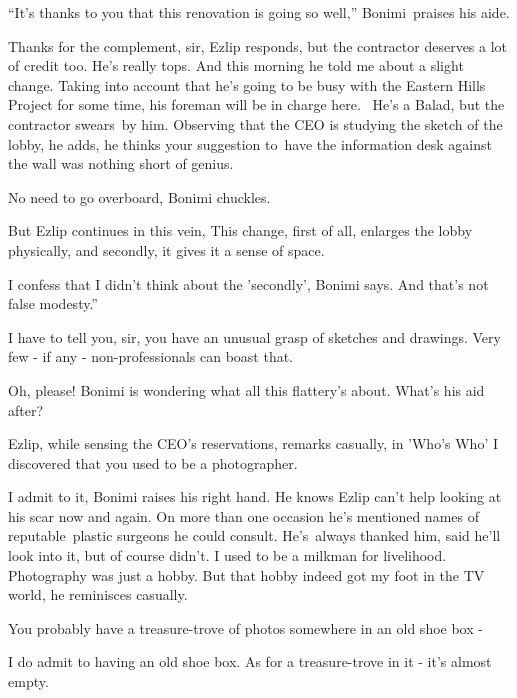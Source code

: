 \documentclass[twoside,11pt]{book}
\begin{document}
{}``It's thanks to you that this renovation is going so well,'' Bonimi{\ }praises his aide.

{\textquotedbl}Thanks for the complement, sir,{\textquotedbl} Ezlip responds, {\textquotedbl}but the contractor deserves
a lot of credit too. He's really tops. And this morning he told me about a slight change. Taking into account that he's
going to be busy with the Eastern Hills Project for some time, his foreman will be in charge here. ~He's a Balad, but
the contractor swears{\ }by him.{\textquotedbl} Observing that the CEO is studying the sketch of the
lobby, he adds, {\textquotedbl}he thinks your suggestion to{\ }have the information desk against the
wall was nothing short of genius.{\textquotedbl} 

{\textquotedbl}No need to go overboard,{\textquotedbl} Bonimi chuckles. 

But Ezlip continues in this vein, {\textquotedbl}This change, first of all, enlarges the lobby physically, and secondly,
it gives it a sense of space.{\textquotedbl}

{\textquotedbl}I confess that I didn't think about the 'secondly',{\textquotedbl} Bonimi says. {\textquotedbl}And that's
not false modesty.''

{\textquotedbl}I have to tell you, sir, you have an unusual grasp of sketches and drawings. Very few - if any -
non-professionals can boast that.{\textquotedbl} 

{\textquotedbl}Oh, please!{\textquotedbl} Bonimi is wondering what all this flattery's about. What's his aid after? 

Ezlip, while sensing the CEO's reservations, remarks casually, {\textquotedbl}in 'Who's Who' I discovered that you used
to be a photographer.{\textquotedbl}

{\textquotedbl}I admit to it,{\textquotedbl} Bonimi raises his right hand. He knows Ezlip can't help looking at his scar
now and again. On more than one occasion he's mentioned names of reputable{\ }plastic surgeons he could
consult. He's\ always thanked him, said he'll look into it, but of course didn't. {\textquotedbl}I used to be a milkman
for livelihood. Photography was just a hobby. But that hobby indeed got my foot in the TV world,{\textquotedbl} he
reminisces casually.\ 

{\textquotedbl}You probably have a treasure-trove of photos somewhere in an old shoe box -{\textquotedbl} 

{\textquotedbl}I do admit to having an old shoe box. As for a treasure-trove in it {}- it's almost
empty.{\textquotedbl}~ 
\end{document}
